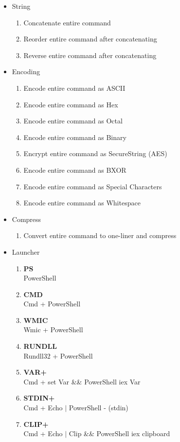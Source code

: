 \documentclass{article}%
\begin{document}
\begin{itemize}
\begin{enumerate}
	\end{enumerate}
	\item String
	\begin{enumerate}
		\item Concatenate entire command
		\item Reorder entire command after concatenating
		\item Reverse entire command after concatenating
	\end{enumerate}
	\item Encoding
	\begin{enumerate}
		\item Encode entire command as ASCII
		\item Encode entire command as Hex
		\item Encode entire command as Octal
		\item Encode entire command as Binary
		\item Encrypt entire command as SecureString (AES)
		\item Encode entire command as BXOR
		\item Encode entire command as Special Characters
		\item Encode entire command as Whitespace
	\end{enumerate}
	\item Compress
	\begin{enumerate}
		\item Convert entire command to one-liner and compress
	\end{enumerate}
	\item Launcher
	\begin{enumerate}
		\item \textbf{PS} 			
		\\PowerShell
		\item \textbf{CMD}      	
		\\Cmd + PowerShell
		\item \textbf{WMIC}      	
		\\Wmic + PowerShell
		\item \textbf{RUNDLL}  		
		\\Rundll32 + PowerShell
		\item \textbf{VAR+}     	
		\\Cmd + set Var \&\& PowerShell iex Var
		\item \textbf{STDIN+}   	
		\\Cmd + Echo $|$ PowerShell - (stdin)
		\item \textbf{CLIP+}     	
		\\Cmd + Echo $|$ Clip \&\& PowerShell iex clipboard

\end{enumerate}
\end{itemize}
\end{document}
